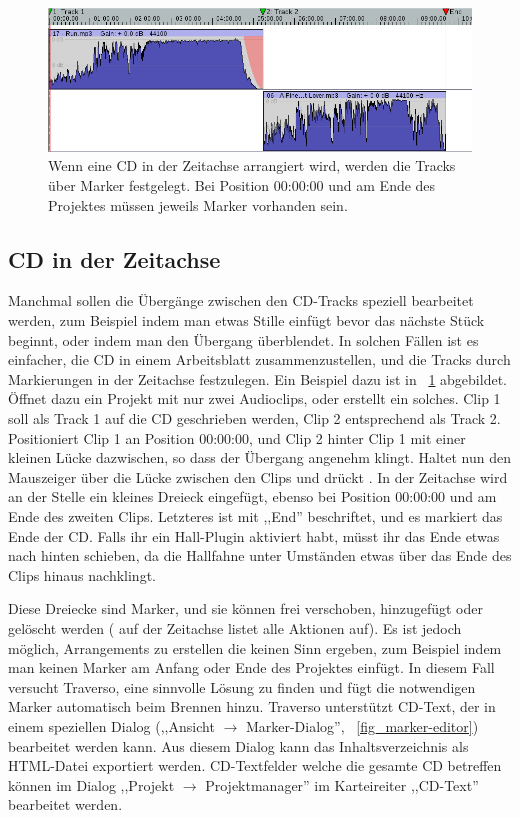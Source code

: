 \begin{figure}[t]
 \centering\includegraphics[width=\textwidth]{../images/markers01}
 \caption{Wenn eine CD in der Zeitachse arrangiert wird, werden die Tracks über Marker festgelegt. Bei Position 00:00:00 und am Ende des Projektes müssen jeweils Marker vorhanden sein.}
 \label{fig_markers01}
\end{figure}

\subsection{CD in der Zeitachse}
Manchmal sollen die Übergänge zwischen den CD-Tracks speziell bearbeitet werden, zum Beispiel indem man etwas Stille einfügt bevor das nächste Stück beginnt, oder indem man den Übergang überblendet. In solchen Fällen ist es einfacher, die CD in einem Arbeitsblatt zusammenzustellen, und die Tracks durch Markierungen in der Zeitachse festzulegen. Ein Beispiel dazu ist in \FigT~\ref{fig_markers01} abgebildet. Öffnet dazu ein Projekt mit nur zwei Audioclips, oder erstellt ein solches. Clip 1 soll als Track 1 auf die CD geschrieben werden, Clip 2 entsprechend als Track 2. Positioniert Clip 1 an Position 00:00:00, und Clip 2 hinter Clip 1 mit einer kleinen Lücke dazwischen, so dass der Übergang angenehm klingt. Haltet nun den Mauszeiger über die Lücke zwischen den Clips und drückt . In der Zeitachse wird an der Stelle ein kleines Dreieck eingefügt, ebenso bei Position 00:00:00 und am Ende des zweiten Clips. Letzteres ist mit ,,End'' beschriftet, und es markiert das Ende der CD. Falls ihr ein Hall-Plugin aktiviert habt, müsst ihr das Ende etwas nach hinten schieben, da die Hallfahne unter Umständen etwas über das Ende des Clips hinaus nachklingt.

Diese Dreiecke sind Marker, und sie können frei verschoben, hinzugefügt oder gelöscht werden ( auf der Zeitachse listet alle Aktionen auf). Es ist jedoch möglich, Arrangements zu erstellen die keinen Sinn ergeben, zum Beispiel indem man keinen Marker am Anfang oder Ende des Projektes einfügt. In diesem Fall versucht Traverso, eine sinnvolle Lösung zu finden und fügt die notwendigen Marker automatisch beim Brennen hinzu. Traverso unterstützt CD-Text, der in einem speziellen Dialog (,,Ansicht $\rightarrow$ Marker-Dialog'', \FigT~\ref{fig_marker-editor}) bearbeitet werden kann. Aus diesem Dialog kann das Inhaltsverzeichnis als HTML-Datei exportiert werden. CD-Textfelder welche die gesamte CD betreffen können im Dialog ,,Projekt $\rightarrow$ Projektmanager'' im Karteireiter ,,CD-Text'' bearbeitet werden.

